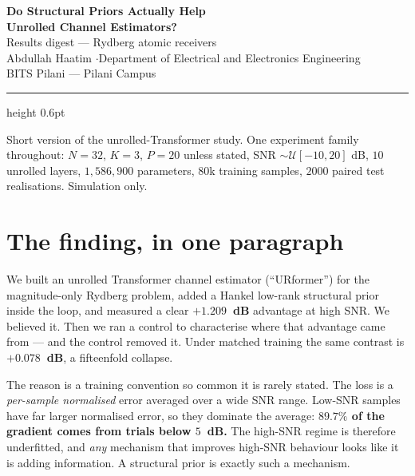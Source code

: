 \documentclass[11pt]{article}
\begin{document}
\begin{center}
{\LARGE\bfseries Do Structural Priors Actually Help}\\[3pt]
{\LARGE\bfseries Unrolled Channel Estimators?}\\[8pt]
{\large Results digest --- Rydberg atomic receivers}\\[6pt]
{\normalsize Abdullah Haatim \quad$\cdot$\quad Department of Electrical and
Electronics Engineering}\\
{\normalsize BITS Pilani --- Pilani Campus}
\end{center}

\vspace{2pt}
\hrule height 0.6pt
\vspace{10pt}

{\small
Short version of the unrolled-Transformer study. One experiment family
throughout: $N=32$, $K=3$, $P=20$ unless stated, SNR $\sim\mathcal{U}[-10,20]$
dB, $10$ unrolled layers, $1{,}586{,}900$ parameters, $80$k training samples,
$2000$ paired test realisations. Simulation only.
\par}

\vspace{6pt}

\section{The finding, in one paragraph}

We built an unrolled Transformer channel estimator (``URformer'') for the
magnitude-only Rydberg problem, added a Hankel low-rank structural prior inside
the loop, and measured a clear \textbf{$+1.209$~dB} advantage at high SNR. We
believed it. Then we ran a control to characterise where that advantage came
from --- and the control removed it. Under matched training the same contrast
is \textbf{$+0.078$~dB}, a fifteenfold collapse.

The reason is a training convention so common it is rarely stated. The loss is
a \emph{per-sample normalised} error averaged over a wide SNR range. Low-SNR
samples have far larger normalised error, so they dominate the average:
\textbf{$89.7\%$ of the gradient comes from trials below $5$~dB.} The high-SNR
regime is therefore underfitted, and \emph{any} mechanism that improves
high-SNR behaviour looks like it is adding information. A structural prior is
exactly such a mechanism.
\end{document}
